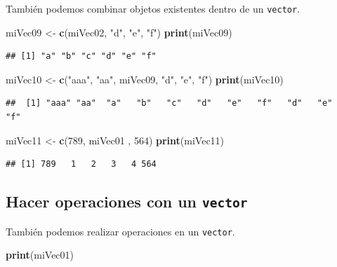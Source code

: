 \documentclass[]{book}
\newenvironment{Shaded}{\begin{snugshade}}{\end{snugshade}}
\newcommand{\KeywordTok}[1]{\textcolor[rgb]{0.13,0.29,0.53}{\textbf{#1}}}
\newcommand{\DecValTok}[1]{\textcolor[rgb]{0.00,0.00,0.81}{#1}}
\newcommand{\StringTok}[1]{\textcolor[rgb]{0.31,0.60,0.02}{#1}}
\newcommand{\NormalTok}[1]{#1}
\begin{document}
También podemos combinar objetos existentes dentro de un
\texttt{vector}.

\begin{Shaded}
\begin{Highlighting}[]
\NormalTok{miVec09 <-}\StringTok{ }\KeywordTok{c}\NormalTok{(miVec02, }\StringTok{"d"}\NormalTok{, }\StringTok{"e"}\NormalTok{, }\StringTok{"f"}\NormalTok{)}
\KeywordTok{print}\NormalTok{(miVec09)}
\end{Highlighting}
\end{Shaded}

\begin{verbatim}
## [1] "a" "b" "c" "d" "e" "f"
\end{verbatim}

\begin{Shaded}
\begin{Highlighting}[]
\NormalTok{miVec10 <-}\StringTok{ }\KeywordTok{c}\NormalTok{(}\StringTok{"aaa"}\NormalTok{, }\StringTok{"aa"}\NormalTok{, miVec09, }\StringTok{"d"}\NormalTok{, }\StringTok{"e"}\NormalTok{, }\StringTok{"f"}\NormalTok{)}
\KeywordTok{print}\NormalTok{(miVec10)}
\end{Highlighting}
\end{Shaded}

\begin{verbatim}
##  [1] "aaa" "aa"  "a"   "b"   "c"   "d"   "e"   "f"   "d"   "e"   "f"
\end{verbatim}

\begin{Shaded}
\begin{Highlighting}[]
\NormalTok{miVec11 <-}\StringTok{ }\KeywordTok{c}\NormalTok{(}\DecValTok{789}\NormalTok{, miVec01 , }\DecValTok{564}\NormalTok{)}
\KeywordTok{print}\NormalTok{(miVec11)}
\end{Highlighting}
\end{Shaded}

\begin{verbatim}
## [1] 789   1   2   3   4 564
\end{verbatim}

\subsection{\texorpdfstring{Hacer operaciones con un
\texttt{vector}}{Hacer operaciones con un vector}}\label{hacer-operaciones-con-un-vector}

También podemos realizar operaciones en un \texttt{vector}.

\begin{Shaded}
\begin{Highlighting}[]
\KeywordTok{print}\NormalTok{(miVec01)}
\end{Highlighting}
\end{Shaded}
\end{document}
